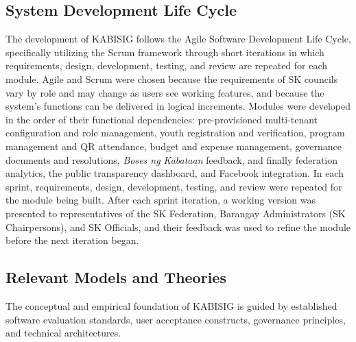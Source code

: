 \subsection{System Development Life Cycle}
\label{subsec:system_development_life_cycle}

\hspace*{\parindent}The development of KABISIG follows the Agile Software Development Life Cycle, specifically utilizing the Scrum framework through short iterations in which requirements, design, development, testing, and review are repeated for each module. Agile and Scrum were chosen because the requirements of SK councils vary by role and may change as users see working features, and because the system's functions can be delivered in logical increments. Modules were developed in the order of their functional dependencies: pre-provisioned multi-tenant configuration and role management, youth registration and verification, program management and QR attendance, budget and expense management, governance documents and resolutions, \textit{Boses ng Kabataan} feedback, and finally federation analytics, the public transparency dashboard, and Facebook integration. In each sprint, requirements, design, development, testing, and review were repeated for the module being built. After each sprint iteration, a working version was presented to representatives of the SK Federation, Barangay Administrators (SK Chairpersons), and SK Officials, and their feedback was used to refine the module before the next iteration began.
\vspace{5mm}

\subsection{Relevant Models and Theories}
\label{subsec:relevant_models_and_theories}

\hspace*{\parindent}The conceptual and empirical foundation of KABISIG is guided by established software evaluation standards, user acceptance constructs, governance principles, and technical architectures.

